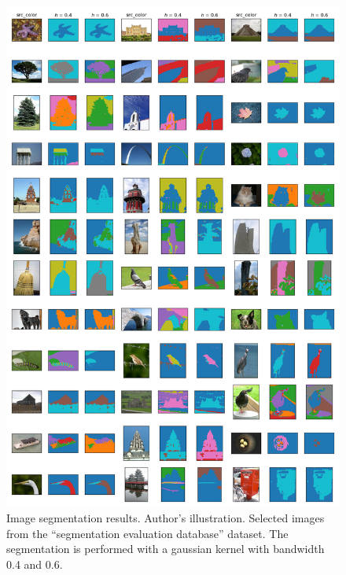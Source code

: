 \documentclass{article}
\begin{document}
\begin{figure}
	\centering
	\includegraphics[width=\textwidth]{figures/segmentation-results-overview.png}
	\caption[Image segmentation results]{Image segmentation results. Author's illustration. Selected images from the ``segmentation evaluation database'' dataset. The segmentation is performed with a gaussian kernel with bandwidth 0.4 and 0.6.}
	\label{fig:segmentation-results-overview}
\end{figure}
\end{document}
